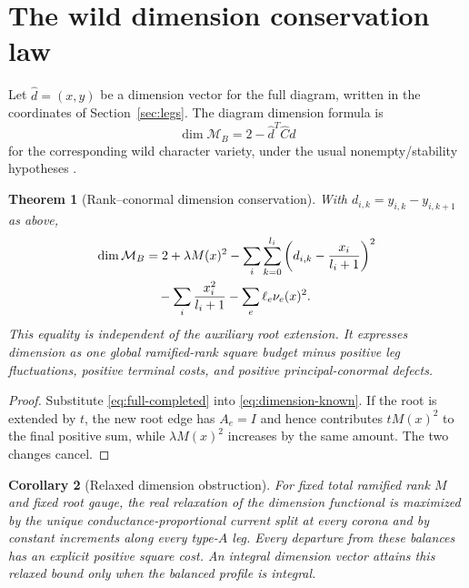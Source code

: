 \documentclass[11pt,a4paper]{amsart}
\theoremstyle{plain}
\newtheorem{theorem}{Theorem}[section]
\newtheorem{corollary}[theorem]{Corollary}
\theoremstyle{definition}
\newcommand{\Mcal}{\mathcal M}
\begin{document}
\section{The wild dimension conservation law}\label{sec:dimension}

Let $\widehat d=(x,y)$ be a dimension vector for the full diagram, written in the coordinates of
Section~\ref{sec:legs}.  The diagram dimension formula is
\begin{equation}\label{eq:dimension-known}
                \dim\Mcal_B=2-\widehat d^T\widehat C\widehat d
\end{equation}
for the corresponding wild character variety, under the usual nonempty/stability hypotheses
\cite{Doucot2021Diagrams}.

\begin{theorem}[Rank--conormal dimension conservation]\label{thm:dimension-law}
With $d_{i,k}=y_{i,k}-y_{i,k+1}$ as above,
\begin{align}\label{eq:dimension-law}
 \dim\Mcal_B
 &=2+\lambda M(x)^2
 -\sum_i\sum_{k=0}^{l_i}
     \left(d_{i,k}-\frac{x_i}{l_i+1}\right)^2\notag\\
 &\quad-\sum_i\frac{x_i^2}{l_i+1}
 -\sum_e\ell_e\nu_e(x)^2.
\end{align}
This equality is independent of the auxiliary root extension.  It expresses dimension as one
global ramified-rank square budget minus positive leg fluctuations, positive terminal costs, and
positive principal-conormal defects.
\end{theorem}

\begin{proof}
Substitute \eqref{eq:full-completed} into \eqref{eq:dimension-known}.  If the root is extended by
$t$, the new root edge has $A_e=I$ and hence contributes $tM(x)^2$ to the final positive sum, while
$\lambda M(x)^2$ increases by the same amount.  The two changes cancel.
\end{proof}

\begin{corollary}[Relaxed dimension obstruction]\label{cor:dimension-obstruction}
For fixed total ramified rank $M$ and fixed root gauge, the real relaxation of the dimension
functional is maximized by the unique conductance-proportional current split at every corona and by
constant increments along every type-$A$ leg.  Every departure from these balances has an explicit
positive square cost.  An integral dimension vector attains this relaxed bound only when the
balanced profile is integral.
\end{corollary}
\end{document}
